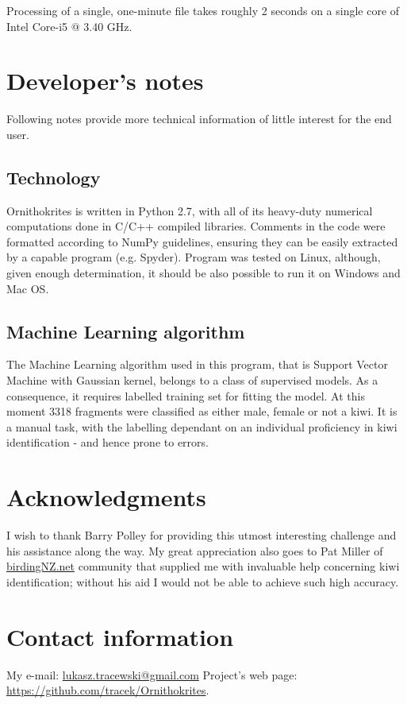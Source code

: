 \documentclass[paper=a4, fontsize=11pt]{scrartcl}	%
\numberwithin{equation}{section}		%
\numberwithin{figure}{section}			%
\numberwithin{table}{section}				%
\begin{document}
Processing of a single, one-minute file takes roughly 2 seconds on a single core of Intel Core-i5 @ 3.40 GHz.

\section{Developer's notes}
Following notes provide more technical information of little interest for the end user.
\subsection{Technology}
Ornithokrites is written in Python 2.7, with all of its heavy-duty numerical computations done in C/C++ compiled libraries. Comments in the code were formatted according to NumPy guidelines, ensuring they can be easily extracted by a capable program (e.g. Spyder). Program was tested on Linux, although, given enough determination, it should be also possible to run it on Windows and Mac OS.
\subsection{Machine Learning algorithm}
The Machine Learning algorithm used in this program, that is Support Vector Machine with Gaussian kernel, belongs to a class of supervised models. As a consequence, it requires labelled training set for fitting the model. At this moment 3318 fragments were classified as either male, female or not a kiwi. It is a manual task, with the labelling dependant on an individual proficiency in kiwi identification - and hence prone to errors.

\section{Acknowledgments}
I wish to thank Barry Polley for providing this utmost interesting challenge and his assistance along the way. My great appreciation also goes to Pat Miller of \url{birdingNZ.net} community that supplied me with invaluable help concerning kiwi identification; without his aid I would not be able to achieve such high accuracy.

\section{Contact information}
My e-mail: \href{mailto:lukasz.tracewski@gmail.com}{lukasz.tracewski@gmail.com}
\newline
Project's web page: \url{https://github.com/tracek/Ornithokrites}.

\end{document}
